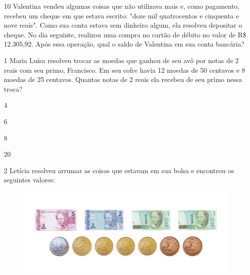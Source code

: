 \num{10} Valentina vendeu algumas coisas que não utilizava mais e, como
pagamento, recebeu um cheque em que estava escrito: "doze mil quatrocentos
e cinquenta e nove reais". Como sua conta estava sem dinheiro algum, ela
resolveu depositar o cheque. No dia seguinte, realizou uma compra no cartão de débito no valor de R\$ 12.305,92. Após essa operação, qual o
saldo de Valentina em sua conta bancária?




\num{1} Maria Luísa resolveu trocar as moedas que ganhou de seu avô por
notas de 2 reais com seu primo, Francisco. Em seu cofre havia 12 moedas de 50 centavos e 8 moedas de 25 centavos. Quantas notas de 2
reais ela recebeu de seu primo nessa troca?

\begin{escolha}
\item
  4
\item
  6
\item
  8
\item
  20
\end{escolha}


\num{2} Letícia resolveu arrumar as coisas que estavam em sua bolsa e
encontrou os seguintes valores:

\begin{figure}[htpb!]
\includegraphics[width=\textwidth]{../ilustracoes/MAT5/SAEB_5ANO_MAT_figura56.png}
\end{figure}

